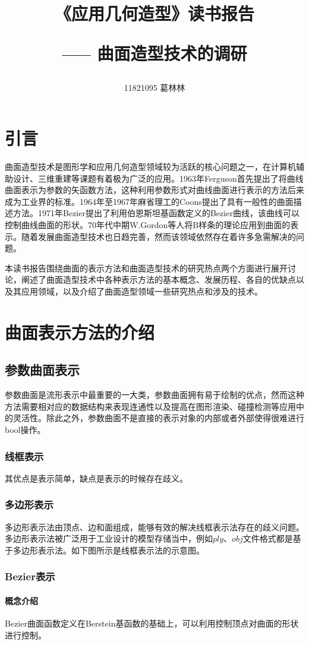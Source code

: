 \documentclass[11pt]{article}
\title{《应用几何造型》读书报告  \begin{large} \hspace{1pt}----- \hspace{1pt}  曲面造型技术的调研\end{large} }
\author{11821095 葛林林}
\begin{document}
\maketitle
\section{引言}
曲面造型技术是图形学和应用几何造型领域较为活跃的核心问题之一，在计算机辅助设计、三维重建等课题有着极为广泛的应用。1963年Ferguson首先提出了将曲线曲面表示为参数的矢函数方法，这种利用参数形式对曲线曲面进行表示的方法后来成为工业界的标准。1964年至1967年麻省理工的Coons提出了具有一般性的曲面描述方法。1971年Bezier提出了利用伯恩斯坦基函数定义的Bezier曲线，该曲线可以控制曲线曲面的形状。70年代中期W.Gordon等人将B样条的理论应用到曲面的表示。随着发展曲面造型技术也日趋完善，然而该领域依然存在着许多急需解决的问题。
\par 本读书报告围绕曲面的表示方法和曲面造型技术的研究热点两个方面进行展开讨论，阐述了曲面造型技术中各种表示方法的基本概念、发展历程、各自的优缺点以及其应用领域，以及介绍了曲面造型领域一些研究热点和涉及的技术。

\section{曲面表示方法的介绍}
\subsection{参数曲面表示}
参数曲面是流形表示中最重要的一大类，参数曲面拥有易于绘制的优点，然而这种方法需要相对应的数据结构来表现连通性以及提高在图形渲染、碰撞检测等应用中的灵活性。除此之外，参数曲面不是直接的表示对象的内部或者外部使得很难进行bool操作。
\subsubsection{线框表示} 其优点是表示简单，缺点是表示的时候存在歧义。
\subsubsection{多边形表示}多边形表示法由顶点、边和面组成，能够有效的解决线框表示法存在的歧义问题。多边形表示法被广泛用于工业设计的模型存储当中，例如$ply$、$obj$文件格式都是基于多边形表示法。如下图所示是线框表示法的示意图。

\subsubsection{Bezier表示}
\paragraph{概念介绍} \mbox{}
\par Bezier曲面函数定义在Berstein基函数的基础上，可以利用控制顶点对曲面的形状进行控制。
\end{document}
